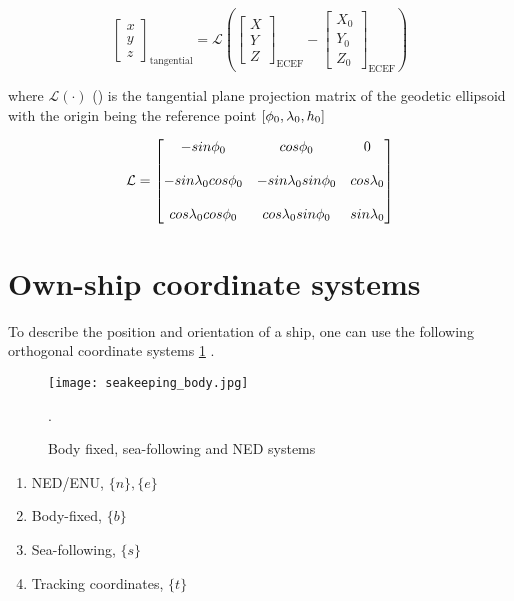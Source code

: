 \begin{equation} \label{eq:transformation_ECEF2ENU}
	\begin{bmatrix}
		x\\
		y\\
		z
	\end{bmatrix}_{\text{tangential}}= \mathcal{L}\left(\begin{bmatrix}
		X\\
		Y\\
		Z
	\end{bmatrix}_{\text{ECEF}} - \begin{bmatrix}
		X_0\\
		Y_0\\
		Z_0
	\end{bmatrix}_{\text{ECEF}}\right)
\end{equation}


where $\mathcal{L}(\cdot)$ () is the tangential plane projection matrix of the geodetic ellipsoid with the origin being the reference point $[{\phi}_0,{\lambda}_0,h_0]$ 




\begin{equation} \label{eq:Lambda}
\mathcal{L} = \begin{bmatrix}
-sin{\phi}_0  & cos{\phi}_0 & 0 \\\\
-sin{\lambda}_0cos{\phi}_0 & -sin{\lambda}_0sin{\phi}_0 & cos{\lambda}_0\\\\
cos{\lambda}_0 cos{\phi}_0 & cos{\lambda}_0 sin{\phi}_0 & sin{\lambda}_0
\end{bmatrix}
\end{equation}

\section{Own-ship coordinate systems}



To describe the position and orientation of a ship, one can use the following orthogonal coordinate systems  \cref{fig:ownship_frames} \cite{Perez2007} .


\begin{figure}[H] 	
	\centering
	\texttt{[image: seakeeping\_body.jpg]}
	\caption{Body fixed, sea-following and NED systems \cite{Perez2007}}.
	\label{fig:ownship_frames}	
\end{figure}

\begin{enumerate}
	\item NED/ENU, $\{n\} , \{e\}$
	\item Body-fixed, $\{b\}$
	\item Sea-following, $\{s\}$
	\item Tracking coordinates, $\{t\}$
\end{enumerate}



